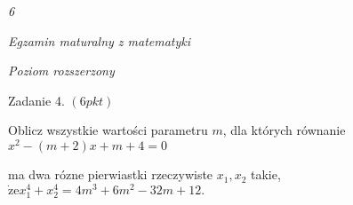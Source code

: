 \documentclass[a4paper,12pt]{article}
\begin{document}
{\it 6}

{\it Egzamin maturalny z matematyki}

{\it Poziom rozszerzony}

Zadanie 4. $(6pkt)$

Oblicz wszystkie wartości parametru $m$, dla których równanie $x^{2}-(m+2)x+m+4=0$

ma dwa rózne pierwiastki rzeczywiste $x_{1}, x_{2}$ takie, $\dot{\mathrm{z}}\mathrm{e}x_{1}^{4}+x_{2}^{4}=4m^{3}+6m^{2}-32m+12.$
\end{document}
